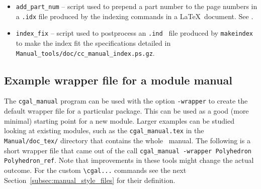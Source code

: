\begin{itemize}
   \item \verb|add_part_num|%
         -- script used to prepend a part number to the
         page numbers in a {\tt .idx} file produced by the indexing commands in
         a \LaTeX\ document.
         See .
   \item \verb|index_fix|%
         -- script used to postprocess an {\tt .ind } file
         produced by {\tt makeindex} to make the index fit the specifications
         detailed in %
         {{\tt Manual\_tools/doc/cc\_manual\_index.ps.gz}}.
\end{itemize}
\ccModifierCrossRefOn

\subsection{Example wrapper file for a module manual\label{subsec:wrapper_module_manual}}

The \texttt{cgal\_manual} program can be used with the option
\texttt{-wrapper} to create the default wrapper file for a particular
package. This can be used as a good (more minimal) starting point for
a new module. Larger examples can be studied looking at existing
modules, such as the \texttt{cgal\_manual.tex} in the
\texttt{Manual/doc\_tex/} directory that contains the whole \cgal\
manual. The following is a short wrapper file that came out of the
call \texttt{cgal\_manual -wrapper Polyhedron Polyhedron\_ref}. Note
that improvements in these tools might change the actual outcome. For
the custom \verb|\cgal...| commands see the next
Section~\ref{subsec:manual_style_files} for their definition.

